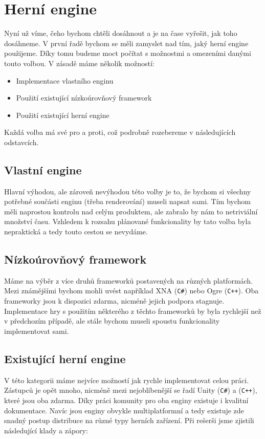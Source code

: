 
\section{Herní engine}
Nyní už víme, čeho bychom chtěli dosáhnout a je na čase vyřešit, jak toho dosáhneme. V první řadě bychom se měli zamyslet nad tím, jaký herní engine použijeme. Díky tomu budeme moct počítat s možnostmi a omezeními danými touto volbou. V zásadě máme několik možností:

\begin{itemize}
	\item Implementace vlastního enginu
	\item Použití existující nízkoúrovňový framework
	\item Použití existující herní engine
\end{itemize}

Každá volba má své pro a proti, což podrobně rozebereme v následujících odstavcích.

\subsection{Vlastní engine}
Hlavní výhodou, ale zároveň nevýhodou této volby je to, že bychom si všechny potřebné součásti enginu (třeba renderování) museli napsat sami. Tím bychom měli naprostou kontrolu nad celým produktem, ale zabralo by nám to netriviální množství času.
Vzhledem k rozsahu plánované funkcionality by tato volba byla nepraktická a tedy touto cestou se nevydáme.

\subsection{Nízkoúrovňový framework}
Máme na výběr z více druhů frameworků postavených na různých platformách. Mezi známějšími bychom mohli uvést například XNA (\texttt{C\#}) nebo Ogre (\texttt{C++}). Oba frameworky jsou k dispozici zdarma, nicméně jejich podpora stagnuje. Implementace hry s použitím některého z těchto frameworků by byla rychlejší než v předchozím případě, ale stále bychom museli spoustu funkcionality implementovat sami. 

\subsection{Existující herní engine}
V této kategorii máme nejvíce možností jak rychle implementovat celou práci. Zástupců je opět mnoho, nicméně mezi nejoblíbenější se řadí Unity (\texttt{C\#}) a \UE{}(\texttt{C++}), které jsou oba zdarma. Díky práci komunity pro oba enginy existuje i kvalitní dokumentace. Navíc jsou enginy obvykle multiplatformní a tedy existuje zde snadný postup distribuce na různé typy herních zařízení. Při rešerši jsme zjistili následující klady a zápory:

